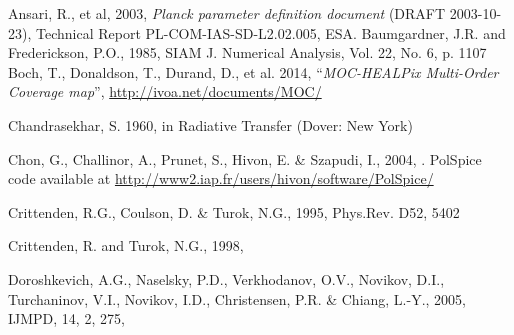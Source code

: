 \documentclass[12pt,twoside]{article}
\begin{document}

\begin{thebibliography}{99}
%
\backrefparscanfalse%

Ansari, R., et al, 2003, {\em Planck parameter definition document} (DRAFT
2003-10-23), Technical Report PL-COM-IAS-SD-L2.02.005, ESA.
\backrefprint%
%
Baumgardner, J.R. and Frederickson, P.O., 1985, SIAM J. Numerical Analysis, Vol. 22,
No. 6, p. 1107
\backrefprint%
%
Boch, T., Donaldson, T., Durand, D., et al. 2014, 
``{\em MOC-HEALPix Multi-Order Coverage map}'', 
\url{http://ivoa.net/documents/MOC/}
\backrefprint%

Chandrasekhar, S. 1960, in Radiative Transfer (Dover: New York) 
\backrefprint%

Chon, G., Challinor, A., Prunet, S., Hivon, E. \& Szapudi, I., 2004, 
.
PolSpice code available at \url{http://www2.iap.fr/users/hivon/software/PolSpice/}
\backrefprint%



Crittenden, R.G., Coulson, D. \&  Turok, N.G., 1995, Phys.Rev. D52, 5402
\backrefprint%

Crittenden, R. and Turok, N.G., 1998, 
\backrefprint%

Doroshkevich, A.G.,
Naselsky,    P.D.,  
Verkhodanov, O.V.,  
Novikov,     D.I.,  
Turchaninov, V.I.,  
Novikov,     I.D.,  
Christensen, P.R. \&
Chiang,	     L.-Y., 2005,
IJMPD, 14, 2, 275, 
\backrefprint%


\end{thebibliography}
\end{document}
